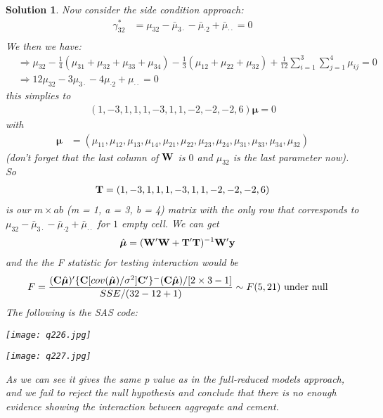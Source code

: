 \documentclass[11pt]{article}
\newtheorem{sol}{Solution}
\begin{document}
\begin{sol}
	Now consider the side condition approach:
	\begin{align*}
		\gamma_{32}^{\ast} &= \mu_{32} - \bar{\mu}_{3\cdot} - \bar{\mu}_{\cdot 2} + \bar{\mu}_{\cdot\cdot} = 0\\
	\end{align*}
	We then we have:
	\begin{align*}
		&\Longrightarrow \mu_{32} - \frac{1}{4}(\mu_{31} + \mu_{32} + \mu_{33} + \mu_{34}) - \frac{1}{3}(\mu_{12} + \mu_{22} + \mu_{32}) + \frac{1}{12}\sum_{i = 1}^3
\sum_{j = 1}^4\mu_{ij} = 0	\\
&\Longrightarrow 12\mu_{32} - 3\mu_{3\cdot} - 4\mu_{\cdot 2} + \mu_{\cdot\cdot} = 0 \end{align*}
this simplies to
\begin{align*}
	(1, -3, 1, 1, 1, -3, 1, 1, -2, -2, -2, 6){\bm\mu} = 0
\end{align*}
with
\begin{align*}
	{\bm\mu} &= (\mu_{11}, \mu_{12}, \mu_{13}, \mu_{14}, \mu_{21}, \mu_{22}, \mu_{23}, \mu_{24}, \mu_{31}, \mu_{33}, \mu_{34}, \mu_{32})
\end{align*}
(don't forget that the last column of ${\bf W}$ is $0$ and $\mu_{32}$ is the last parameter now). \vskip 2mm
So 
\begin{align*}
	{\bf T} = (1, -3, 1, 1, 1, -3, 1, 1, -2, -2, -2, 6)
\end{align*} 
is our $m \times ab$ (m = 1, a = 3, b = 4) matrix with the only row that corresponds to $\mu_{32} -  \bar{\mu}_{3\cdot} - \bar{\mu}_{\cdot 2} + \bar{\mu}_{\cdot\cdot }$ for $1$ empty cell. We can get
\begin{align*}
	\hat{{\bm \mu}} &= ({\bf W}'{\bf W} + {\bf T}'{\bf T})^{-1}{\bf W}'{\bf y}
\end{align*}
and the the F statistic for testing interaction would be
\begin{align*}
	F &= \frac{({\bf C}\hat{{\bm \mu}})'\{{\bf C}[cov(\hat{{\bm \mu}})/\sigma^2]{\bf C}'\}^-({\bf C}\hat{\bm\mu})/[2 \times 3  - 1]}{SSE/(32 - 12 + 1)} \sim F(5, 21) \text{ under null}
\end{align*}
The following is the SAS code:
\begin{center}
	\texttt{[image: q226.jpg]}
\end{center}
\begin{center}
	\texttt{[image: q227.jpg]}
\end{center}
As we can see it gives the same p value as in the full-reduced models approach, and we fail to reject the null hypothesis and conclude that there is no enough evidence showing the interaction between aggregate and cement.\vskip 2mm

\end{sol}
\end{document}
